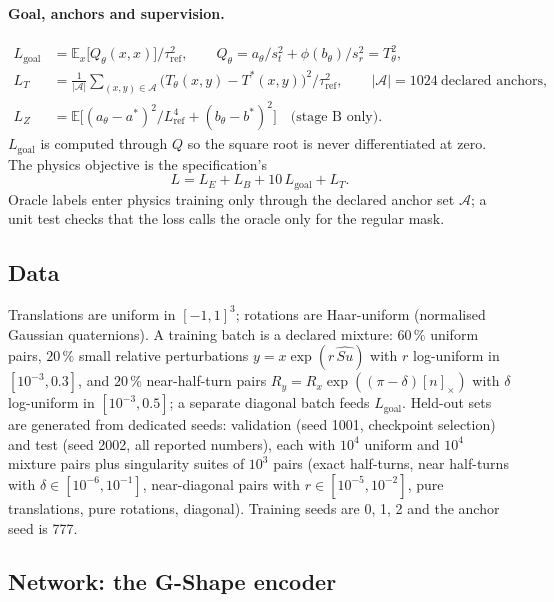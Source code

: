 \documentclass[11pt]{article}
\newcommand{\taur}{\tau_{\mathrm{ref}}}
\newcommand{\pct}{\,\%}
\begin{document}
\paragraph{Goal, anchors and supervision.}
\begin{align}
L_{\mathrm{goal}}&=\mathbb E_x\bigl[Q_\theta(x,x)\bigr]/\taur^2,\qquad
Q_\theta=a_\theta/s_t^2+\phi(b_\theta)/s_r^2=T_\theta^2,\\
L_T&=\frac{1}{|\mathcal A|}\sum_{(x,y)\in\mathcal A}\bigl(T_\theta(x,y)-T^*(x,y)\bigr)^2/\taur^2,
\qquad |\mathcal A|=1024\ \text{declared anchors},\\
L_Z&=\mathbb E\bigl[(a_\theta-a^*)^2/L_{\mathrm{ref}}^4+(b_\theta-b^*)^2\bigr]\quad\text{(stage B only)}.
\end{align}
$L_{\mathrm{goal}}$ is computed through $Q$ so the square root is never differentiated at zero.
The physics objective is the specification's
\begin{equation}
L=L_E+L_B+10\,L_{\mathrm{goal}}+L_T .
\end{equation}
Oracle labels enter physics training only through the declared anchor set $\mathcal A$; a unit test
checks that the loss calls the oracle only for the regular mask.

\subsection{Data}

Translations are uniform in $[-1,1]^3$; rotations are Haar-uniform (normalised Gaussian
quaternions). A training batch is a declared mixture: $60\pct$ uniform pairs, $20\pct$ small relative
perturbations $y=x\exp(r\,\widehat{Su})$ with $r$ log-uniform in $[10^{-3},0.3]$, and $20\pct$
near-half-turn pairs $R_y=R_x\exp((\pi-\delta)[n]_\times)$ with $\delta$ log-uniform in
$[10^{-3},0.5]$; a separate diagonal batch feeds $L_{\mathrm{goal}}$. Held-out sets are generated
from dedicated seeds: validation (seed 1001, checkpoint selection) and test (seed 2002, all reported
numbers), each with $10^4$ uniform and $10^4$ mixture pairs plus singularity suites of $10^3$ pairs
(exact half-turns, near half-turns with $\delta\in[10^{-6},10^{-1}]$, near-diagonal pairs with
$r\in[10^{-5},10^{-2}]$, pure translations, pure rotations, diagonal). Training seeds are 0, 1, 2 and
the anchor seed is 777.

\subsection{Network: the G-Shape encoder}
\end{document}
